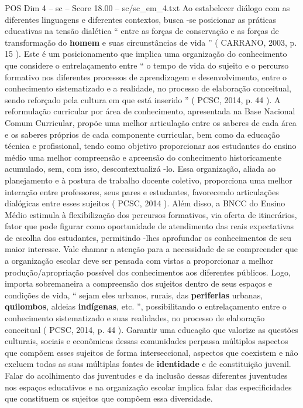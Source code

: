\begin{textsample}{POS Dim 4 – sc – Score 18.00 – sc/sc\_em\_4.txt}
Ao estabelecer diálogo com as diferentes linguagens e diferentes contextos, busca -se posicionar as práticas educativas na tensão dialética “ entre as forças de conservação e as forças de transformação do \textbf{homem} e suas circunstâncias de vida ” ( CARRANO, 2003, p. 15 ).
Este é um posicionamento que implica uma organização do conhecimento que considere o entrelaçamento entre “ o tempo de vida do sujeito e o percurso formativo nos diferentes processos de aprendizagem e desenvolvimento, entre o conhecimento sistematizado e a realidade, no processo de elaboração conceitual, sendo reforçado pela cultura em que está inserido ” ( PCSC, 2014, p. 44 ).
A reformulação curricular por área de conhecimento, apresentada na Base Nacional Comum Curricular, propõe uma melhor articulação entre os saberes de cada área e os saberes próprios de cada componente curricular, bem como da educação técnica e profissional, tendo como objetivo proporcionar aos estudantes do ensino médio uma melhor compreensão e apreensão do conhecimento historicamente acumulado, sem, com isso, descontextualizá -lo.
Essa organização, aliada ao planejamento e à postura de trabalho docente coletivo, proporciona uma melhor interação entre professores, seus pares e estudantes, favorecendo articulações dialógicas entre esses sujeitos ( PCSC, 2014 ).
Além disso, a BNCC do Ensino Médio estimula à flexibilização dos percursos formativos, via oferta de itinerários, fator que pode figurar como oportunidade de atendimento das reais expectativas de escolha dos estudantes, permitindo -lhes aprofundar os conhecimentos de seu maior interesse.
Vale chamar a atenção para a necessidade de se compreender que a organização escolar deve ser pensada com vistas a proporcionar a melhor produção/apropriação possível dos conhecimentos aos diferentes públicos.
Logo, importa sobremaneira a compreensão dos sujeitos dentro de seus espaços e condições de vida, “ sejam eles urbanos, rurais, das \textbf{periferias} urbanas, \textbf{quilombos}, aldeias \textbf{indígenas}, etc. ”, possibilitando o entrelaçamento entre o conhecimento sistematizado e suas realidades, no processo de elaboração conceitual ( PCSC, 2014, p. 44 ).
Garantir uma educação que valorize as questões culturais, sociais e econômicas dessas comunidades perpassa múltiplos aspectos que compõem esses sujeitos de forma interseccional, aspectos que coexistem e não excluem todas as suas múltiplas fontes de \textbf{identidade} e de constituição juvenil.
Falar do acolhimento das juventudes e da inclusão dessas diferentes juventudes nos espaços educativos e na organização escolar implica falar das especificidades que constituem os sujeitos que compõem essa diversidade.

\end{textsample}
